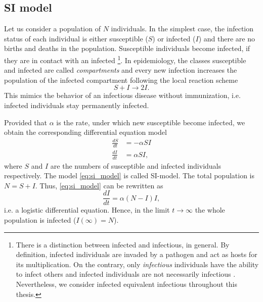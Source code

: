 \subsection{SI model}\label{sec:si_model}
Let us consider a population of $N$ individuals.
In the simplest case, the infection status of each individual is either susceptible ($S$) or infected ($I$) and there are no births and deaths in the population.
Susceptible individuals become infected, if they are in contact with an infected%
\footnote{There is a distinction between infected and infectious, in general.
By definition, infected individuals are invaded by a pathogen and act as hosts for its multiplication.
On the contrary, only \emph{infectious} individuals have the ability to infect others and infected individuals are not necessarily infectious \citep{Rolle:2006vr}.
Nevertheless, we consider infected equivalent infectious throughout this thesis.}.%
In epidemiology, the classes susceptible and infected are called \emph{compartments} and every new infection increases the population of the infected compartment following the local reaction scheme
\[
S+I \rightarrow 2 I.
\]
This mimics the behavior of an infectious disease without immunization, i.e. infected individuals stay permanently infected.

Provided that $\alpha $ is the rate, under which new susceptible become infected, we obtain the corresponding differential equation model
\begin{align}\label{eq:si_model}
\frac{dS}{dt} &= -\alpha SI \nonumber \\
\frac{dI}{dt} &= \alpha SI,
\end{align}
where $S$ and $I$ are the numbers of susceptible and infected individuals respectively.
The model \eqref{eq:si_model} is called SI-model.
The total population is $N=S+I$.
Thus, \eqref{eq:si_model} can be rewritten as
\[
\frac{dI}{dt}=\alpha (N-I)I,
\]
i.e. a logistic differential equation.
Hence, in the limit $t\rightarrow \infty $ the whole population is infected ($I(\infty )=N$). 


